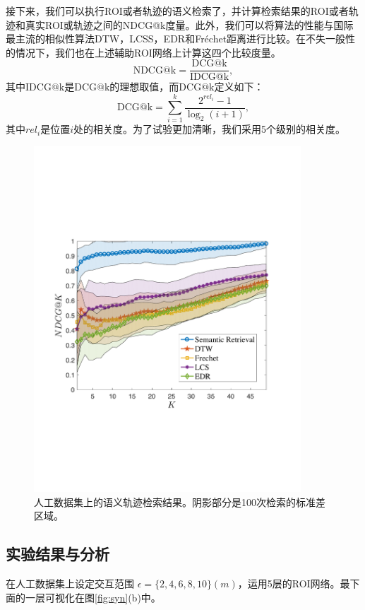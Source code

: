 接下来，我们可以执行ROI或者轨迹的语义检索了，并计算检索结果的ROI或者轨迹和真实ROI或轨迹之间的NDCG@k度量。此外，我们可以将算法的性能与国际最主流的相似性算法DTW，LCSS，EDR和Fr\'echet距离进行比较。在不失一般性的情况下，我们也在上述辅助ROI网络上计算这四个比较度量。
\begin{equation}
\mathrm{NDCG@k} = \frac{\mathrm{DCG@k}}{\mathrm{IDCG@k}},
\label{eq:NDCG}
\end{equation}
其中$\mathrm{IDCG@k}$是$\mathrm{DCG@k}$的理想取值，而$\mathrm{DCG@k}$定义如下：
\begin{equation}
\mathrm{DCG@{k}} = \sum_{i=1}^{k} \frac{ 2^{rel_{i}} - 1 }{ \log_{2}(i+1)},
\label{eq:DCG}
\end{equation}
其中$rel_i$是位置$i$处的相关度。为了试验更加清晰，我们采用5个级别的相关度。

\tabcolsep=0.5pt
\begin{figure}[!b]
\centering
\includegraphics[width=100mm]{pics/synNDCG.pdf}
\caption{人工数据集上的语义轨迹检索结果。阴影部分是100次检索的标准差区域。}
\label{fig:synNDCG}
\end{figure}


\subsection{实验结果与分析}
在人工数据集上设定交互范围 $\epsilon = \{2,4,6,8,10\}(m)$，运用5层的ROI网络。最下面的一层可视化在图\ref{fig:syn}(b)中。


